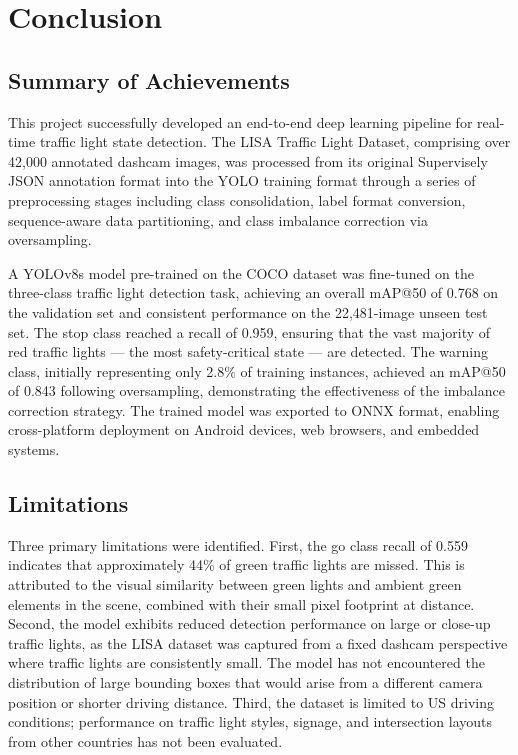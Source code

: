 \chapter{Conclusion}

\section{Summary of Achievements}

This project successfully developed an end-to-end deep learning pipeline for real-time traffic light state detection. The LISA Traffic Light Dataset, comprising over 42,000 annotated dashcam images, was processed from its original Supervisely JSON annotation format into the YOLO training format through a series of preprocessing stages including class consolidation, label format conversion, sequence-aware data partitioning, and class imbalance correction via oversampling.

A YOLOv8s model pre-trained on the COCO dataset was fine-tuned on the three-class traffic light detection task, achieving an overall mAP@50 of 0.768 on the validation set and consistent performance on the 22,481-image unseen test set. The stop class reached a recall of 0.959, ensuring that the vast majority of red traffic lights --- the most safety-critical state --- are detected. The warning class, initially representing only 2.8\% of training instances, achieved an mAP@50 of 0.843 following oversampling, demonstrating the effectiveness of the imbalance correction strategy. The trained model was exported to ONNX format, enabling cross-platform deployment on Android devices, web browsers, and embedded systems.

\section{Limitations}

Three primary limitations were identified. First, the go class recall of 0.559 indicates that approximately 44\% of green traffic lights are missed. This is attributed to the visual similarity between green lights and ambient green elements in the scene, combined with their small pixel footprint at distance. Second, the model exhibits reduced detection performance on large or close-up traffic lights, as the LISA dataset was captured from a fixed dashcam perspective where traffic lights are consistently small. The model has not encountered the distribution of large bounding boxes that would arise from a different camera position or shorter driving distance. Third, the dataset is limited to US driving conditions; performance on traffic light styles, signage, and intersection layouts from other countries has not been evaluated.

